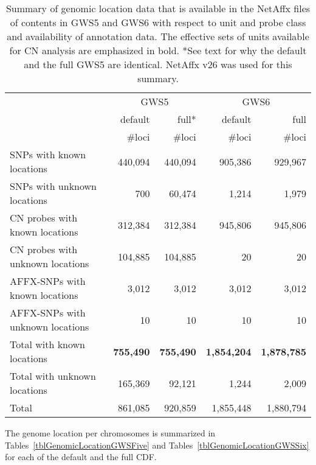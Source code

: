 \documentclass[10pt,a4paper]{article}
\newcommand{\GWSFive}{GWS5\xspace}
\newcommand{\GWSSix}{GWS6\xspace}
\begin{document}
\begin{table}[htp]
\begin{center}
\begin{tabular}{|l||rr||rr|}
\hline
     & \multicolumn{2}{c||}{\GWSFive} & \multicolumn{2}{c|}{\GWSSix} \\
     & default & full* & default & full \\
     & \#loci & \#loci & \#loci & \#loci \\
\hline
\hline
SNPs with known locations        & 440,094 &  440,094  &   905,386 &   929,967 \\
SNPs with unknown locations      &     700 &   60,474  &     1,214 &     1,979 \\
\hline
CN probes with known locations   & 312,384 &  312,384  &   945,806 &   945,806 \\
CN probes with unknown locations & 104,885 &  104,885  &        20 &        20 \\
\hline
AFFX-SNPs with known locations   &   3,012 &    3,012  &     3,012 &     3,012 \\
AFFX-SNPs with unknown locations &      10 &       10  &        10 &        10 \\
\hline
Total with known locations       & \textbf{755,490} & \textbf{755,490} & \textbf{1,854,204}  & \textbf{1,878,785} \\
Total with unknown locations     & 165,369 &   92,121  &    1,244  &     2,009 \\
\hline
Total                            & 861,085 &  920,859  & 1,855,448 & 1,880,794 \\
\hline
\end{tabular}
\end{center}
\caption{Summary of genomic location data that is available in the NetAffx files of contents in GWS5 and GWS6 with respect to unit and probe class and availability of annotation data.  The effective sets of units available for CN analysis are emphasized in bold.  *See text for why the default and the full GWS5 are identical.  NetAffx v26 was used for this summary.}
\label{tblGenomicLocation}
\end{table}

The genome location per chromosomes is summarized in Tables~\ref{tblGenomicLocationGWSFive} and Tables~\ref{tblGenomicLocationGWSSix} for each of the default and the full CDF.
\end{document}
